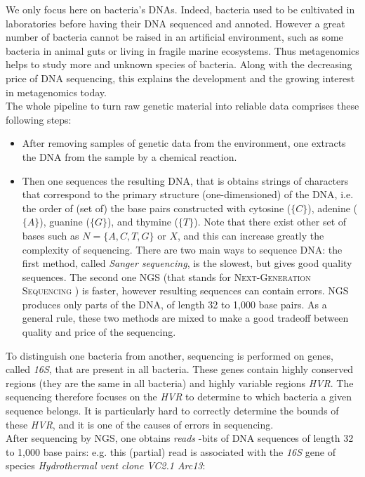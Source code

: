 \documentclass{report}
\begin{document}
We only focus here on bacteria's DNAs. Indeed, bacteria used to be cultivated in laboratories before having their DNA sequenced and annoted. However a great number of bacteria cannot be raised in an artificial environment, such as some bacteria in animal guts or living in fragile marine ecosystems. Thus metagenomics helps to study more and unknown species of bacteria. Along with the decreasing price of DNA sequencing, this explains the development and the growing interest in metagenomics today.\\

The whole pipeline to turn raw genetic material into reliable data comprises these following steps:
\begin{itemize}
\item After removing samples of genetic data from the environment, one extracts the DNA from the sample by a chemical reaction.
\item Then one sequences the resulting DNA, that is obtains strings of characters that correspond to the primary structure (one-dimensioned) of the DNA, i.e. the order of (set of) the base pairs constructed with cytosine ($\{C\}$), adenine ($\{A\}$), guanine ($\{G\}$), and thymine ($\{T\}$). Note that there exist other set of bases such as $N = \{A,C,T,G\}$ or $X$, and this can increase greatly the complexity of sequencing. There are two main ways to sequence DNA: the first method, called \emph{Sanger sequencing}, is the slowest, but gives good quality sequences. The second one \textsc{NGS} (that stands for \textsc{Next-Generation Sequencing} \cite{WikiNGS}) is faster, however resulting sequences can contain errors. \textsc{NGS} produces only parts of the DNA, of length 32 to 1,000 base pairs. As a general rule, these two methods are mixed to make a good tradeoff between quality and price of the sequencing.
\end{itemize}

To distinguish one bacteria from another, sequencing is performed on genes, called \emph{16S}, that are present in all bacteria. These genes contain highly conserved regions (they are the same in all bacteria) and highly variable regions \emph{HVR}. The sequencing therefore focuses on the \emph{HVR} to determine to which bacteria a given sequence belongs. It is particularly hard to correctly determine the bounds of these \emph{HVR}, and it is one of the causes of errors in sequencing.\\

After sequencing by \textsc{NGS}, one obtains \emph{reads} -bits of DNA sequences of length 32 to 1,000 base pairs: e.g. this (partial) read is associated with the \emph{16S} gene of species \emph{Hydrothermal vent clone VC2.1 Arc13}:\\
\end{document}
